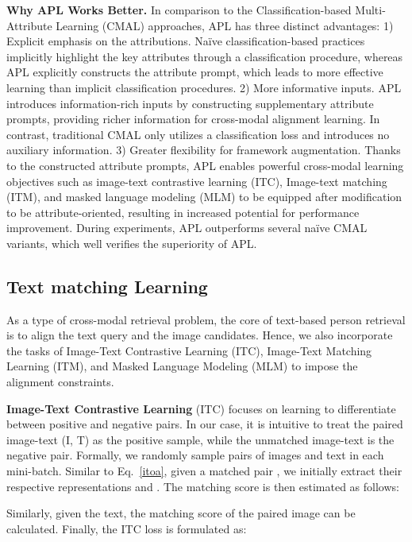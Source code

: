 \documentclass[sigconf]{acmart}
\begin{document}
\noindent\textbf{Why APL Works Better.} 
In comparison to the Classification-based Multi-Attribute Learning (CMAL) approaches, APL has three distinct advantages: 
1) Explicit emphasis on the attributions. Na\"ive classification-based practices implicitly highlight the key attributes through a classification procedure, whereas APL explicitly constructs the attribute prompt, which leads to more effective learning than implicit classification procedures.
2) More informative inputs. APL introduces information-rich inputs by constructing supplementary attribute prompts, providing richer information for cross-modal alignment learning. In contrast, traditional CMAL only utilizes a classification loss and introduces no auxiliary information.
3) Greater flexibility for framework augmentation. Thanks to the constructed attribute prompts, APL enables powerful cross-modal learning objectives such as image-text contrastive learning (ITC), Image-text matching (ITM), and masked language modeling (MLM) to be equipped after modification to be attribute-oriented, resulting in increased potential for performance improvement. During experiments, APL outperforms several na\"ive CMAL variants, which well verifies the superiority of APL.


\subsection{Text matching Learning} 
As a type of cross-modal retrieval problem, the core of text-based person retrieval is to align the text query and the image candidates. Hence, we also incorporate the tasks of Image-Text Contrastive Learning (ITC), Image-Text Matching Learning (ITM), and Masked Language Modeling (MLM) to impose the alignment constraints.


\noindent\textbf{Image-Text Contrastive Learning}
(ITC) focuses on learning to differentiate between positive and negative pairs. In our case, it is intuitive to treat the paired image-text (I, T) as the positive sample, while the unmatched image-text is the negative pair. 
Formally, we randomly sample  pairs of images and text in each mini-batch. Similar to Eq.~\ref{itoa}, given a matched pair , we initially extract their respective representations  and . The matching score is then estimated as follows:
\vspace{-.1in}

Similarly, given the text, the matching score of the paired image   can be calculated.
Finally, the ITC loss is formulated as:
\vspace{-.1in}
\end{document}
